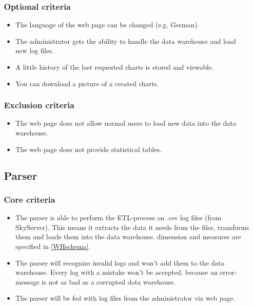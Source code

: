 \subsubsection{Optional criteria}
\begin{itemize}
\item The language of the web page can be changed (e.g. German).

\item The administrator gets the ability to handle the \gls{data warehouse} and load new \glspl{log file}.

\item A little history of the last requested \glspl{chart} is stored and viewable.

\item You can download a picture of a created charts.
\end{itemize}

\subsubsection{Exclusion criteria}
\begin{itemize}
\item The web page does not allow normal users to load new data into the \gls{data warehouse}.

\item The web page does not provide statistical tables. 
\end{itemize}


\subsection{Parser}

\subsubsection{Core criteria} %
\begin{itemize}
\item The \gls{parser} is able to perform the \gls{ETL-process} on \gls{.csv} \glspl{log file}
 (from \gls{SkyServer}). 
This means it extracts the data it needs from the files, transforms them 
and loads them into the \gls{data warehouse}. \gls{dimension} and \glspl{measure} are specified in \ref{WHschema}.
  
\item The \gls{parser} will recognize invalid logs and won't add them to the \gls{data warehouse}.
 Every log with a mistake won't be accepted, because an error-message is not 
 as bad as a corrupted \gls{data warehouse}. 
 
\item The \gls{parser} will be fed with \glspl{log file} from the administrator via web page.
\end{itemize} 

